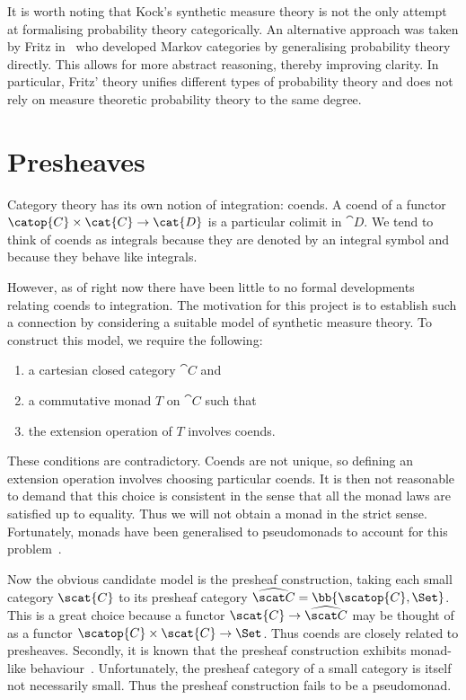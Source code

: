 It is worth noting that Kock's synthetic measure theory is not the only attempt at
formalising probability theory categorically. An alternative approach was taken by
Fritz in~\cite{fritz2020} who developed Markov categories by generalising probability
theory directly. This allows for more abstract reasoning,
thereby improving clarity. In particular, Fritz' theory unifies different types of probability
theory and does not rely on measure theoretic probability theory to the same degree.

\section{Presheaves}

Category theory has its own notion of integration: coends. A coend of a
functor $\catop{C}\times\cat{C}\to\cat{D}$ is a particular colimit in
$\cat{D}$. We tend to think of coends as integrals because they are denoted
by an integral symbol and because they behave like integrals.

However, as of right now there have been little to no formal developments
relating coends to integration. The motivation for this project is to
establish such a connection by considering a suitable model of synthetic
measure theory. To construct this model, we require the following:

\begin{enumerate}
  \item a cartesian closed category $\cat{C}$ and
  \item a commutative monad $T$ on $\cat{C}$ such that
  \item the extension operation of $T$ involves coends.
\end{enumerate}

These conditions are contradictory. Coends are not unique, so defining an
extension operation involves choosing particular coends. It is then not
reasonable to demand that this choice is consistent in the sense that all the
monad laws are satisfied up to equality. Thus we will not obtain a monad in the
strict sense. Fortunately, monads have been generalised to pseudomonads to
account for this problem~\cite{marmolejo2013}.

Now the obvious candidate model is the presheaf construction, taking each small
category $\scat{C}$ to its presheaf category $\widehat{\scat C} =
\bb{\scatop{C}, \Set}$. This is a great choice because a functor
$\scat{C}\to\widehat{\scat C}$ may be thought of as a functor
$\scatop{C}\times\scat{C}\to\Set$. Thus coends are closely related to
presheaves. Secondly, it is known that the presheaf construction exhibits
monad-like behaviour~\cite{fiore2017}. Unfortunately, the presheaf category of
a small category is itself not necessarily small. Thus the presheaf
construction fails to be a pseudomonad.

